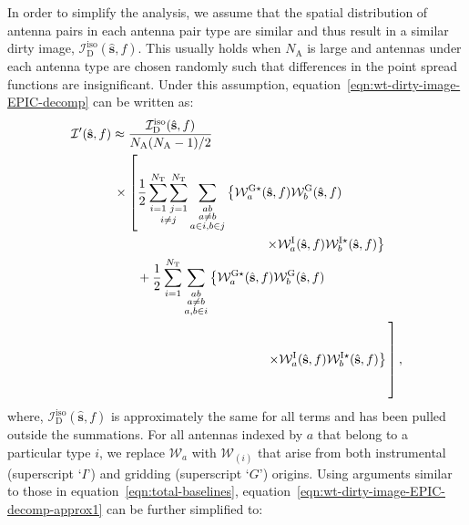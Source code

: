 \documentclass[a4paper,fleqn,usenatbib]{mnras}
\newcommand{\Nant}{N_\textrm{A}}
\begin{document}
In order to simplify the analysis, we assume that the spatial distribution of antenna pairs in each antenna pair type are similar and thus result in a similar dirty image, $\mathcal{I}_\textrm{D}^\textrm{iso}(\hat{\mathbf{s}},f)$. This usually holds when $\Nant$ is large and antennas under each antenna type are chosen randomly such that differences in the point spread functions are insignificant. Under this assumption, equation~\ref{eqn:wt-dirty-image-EPIC-decomp} can be written as:
\begin{align}\label{eqn:wt-dirty-image-EPIC-decomp-approx1}
  \mathcal{I}^\prime(\hat{\mathbf{s}},f) &\approx \frac{\mathcal{I}_\textrm{D}^\textrm{iso}(\hat{\mathbf{s}},f)}{\Nant(\Nant-1)/2} \nonumber\\
  &\,\times \left[\frac{1}{2}\mathop{\sum_{i=1}^{N_\textrm{T}}\sum_{j=1}^{N_\textrm{T}}}_{i\ne j}\sum_{\substack{ab\\a\ne b\\a\in i, b\in j}}\left\{\mathcal{W}^{\textrm{G}\star}_a(\hat{\mathbf{s}},f)\mathcal{W}^\textrm{G}_b(\hat{\mathbf{s}},f)\right.\right.\nonumber\\
  &\qquad\qquad\qquad\qquad\qquad\qquad \left. \times \mathcal{W}^\textrm{I}_a(\hat{\mathbf{s}},f)\mathcal{W}^{\textrm{I}\star}_b(\hat{\mathbf{s}},f)\right\} \nonumber\\ 
  &\qquad + \frac{1}{2}\sum_{i=1}^{N_\textrm{T}}\sum_{\substack{ab\\a\ne b\\a,b\in i}}\left\{\mathcal{W}^{\textrm{G}\star}_a(\hat{\mathbf{s}},f)\mathcal{W}^\textrm{G}_b(\hat{\mathbf{s}},f)\right. \nonumber\\
  &\qquad\qquad\qquad\qquad\qquad\qquad \left.\left.\times\mathcal{W}^\textrm{I}_a(\hat{\mathbf{s}},f)\mathcal{W}^{\textrm{I}\star}_b(\hat{\mathbf{s}},f)\right\}\vphantom{\sum_{\substack{ab\\a\ne b\\a\in i, b\in j}}}\right], 
\end{align}
where, $\mathcal{I}_\textrm{D}^\textrm{iso}(\hat{\mathbf{s}},f)$ is approximately the same for all terms and has been pulled outside the summations. For all antennas indexed by $a$ that belong to a particular type $i$, we replace $\mathcal{W}_a$ with $\mathcal{W}_{(i)}$ that arise from both instrumental (superscript `$I$') and gridding (superscript `$G$') origins. Using arguments similar to those in equation~\ref{eqn:total-baselines}, equation~\ref{eqn:wt-dirty-image-EPIC-decomp-approx1} can be further simplified to:
\end{document}

